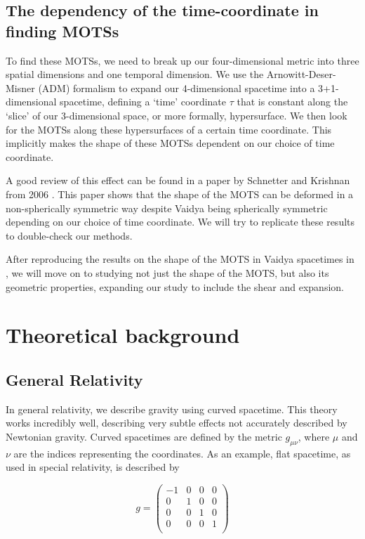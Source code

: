 \documentclass[twoside, openright]{RadboudReport}
\newcommand{\mn}{{\mu\nu}}
\begin{document}
\section{The dependency of the time-coordinate in finding MOTSs}

To find these MOTSs, we need to break up our four-dimensional metric into three spatial dimensions and one temporal dimension. We use the Arnowitt-Deser-Misner (ADM) formalism to expand our 4-dimensional spacetime into a 3+1-dimensional spacetime, defining a `time' coordinate $\tau$ that is constant along the `slice' of our 3-dimensional space, or more formally, hypersurface. We then look for the MOTSs along these hypersurfaces of a certain time coordinate. This implicitly makes the shape of these MOTSs dependent on our choice of time coordinate.\newline

A good review of this effect can be found in a paper by Schnetter and Krishnan from 2006 \cite{badripaper}. This paper shows that the shape of the MOTS can be deformed in a non-spherically symmetric way despite Vaidya being spherically symmetric depending on our choice of time coordinate. We will try to replicate these results to double-check our methods. \newline

After reproducing the results on the shape of the MOTS in Vaidya spacetimes in \cite{badripaper}, we will move on to studying not just the shape of the MOTS, but also its geometric properties, expanding our study to include the shear and expansion.

\chapter{Theoretical background}
\label{chapter:theoreticalbackground}

\section{General Relativity}

In general relativity, we describe gravity using curved spacetime. This theory works incredibly well, describing very subtle effects not accurately described by Newtonian gravity. Curved spacetimes are defined by the metric $g_\mn$, where $\mu$ and $\nu$ are the indices representing the coordinates. As an example, flat spacetime, as used in special relativity, is described by

\begin{equation}
	g = 
	\begin{pmatrix}
		-1 & 0 & 0 & 0 \\
		0 & 1 & 0  & 0 \\
		0 & 0 & 1 & 0 \\
		0 & 0 & 0 & 1 \\
	\end{pmatrix}
\end{equation}
\end{document}
